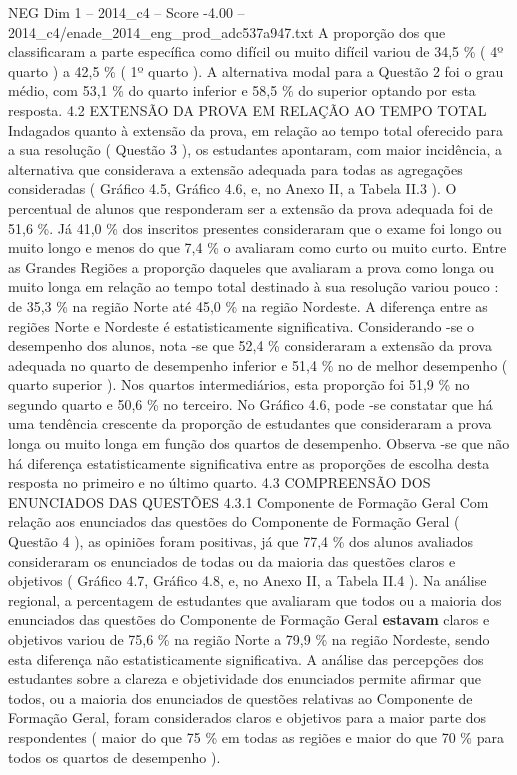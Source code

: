 \begin{textsample}{NEG Dim 1 – 2014\_c4 – Score -4.00 – 2014\_c4/enade\_2014\_eng\_prod\_adc537a947.txt}
A proporção dos que classificaram a parte específica como difícil ou muito difícil variou de 34,5 \% ( 4º quarto ) a 42,5 \% ( 1º quarto ).
A alternativa modal para a Questão 2 foi o grau médio, com 53,1 \% do quarto inferior e 58,5 \% do superior optando por esta resposta. 4.2 EXTENSÃO DA PROVA EM RELAÇÃO AO TEMPO TOTAL Indagados quanto à extensão da prova, em relação ao tempo total oferecido para a sua resolução ( Questão 3 ), os estudantes apontaram, com maior incidência, a alternativa que considerava a extensão adequada para todas as agregações consideradas ( Gráfico 4.5, Gráfico 4.6, e, no Anexo II, a Tabela II.3 ).
O percentual de alunos que responderam ser a extensão da prova adequada foi de 51,6 \%.
Já 41,0 \% dos inscritos presentes consideraram que o exame foi longo ou muito longo e menos do que 7,4 \% o avaliaram como curto ou muito curto.
Entre as Grandes Regiões a proporção daqueles que avaliaram a prova como longa ou muito longa em relação ao tempo total destinado à sua resolução variou pouco : de 35,3 \% na região Norte até 45,0 \% na região Nordeste.
A diferença entre as regiões Norte e Nordeste é estatisticamente significativa.
Considerando -se o desempenho dos alunos, nota -se que 52,4 \% consideraram a extensão da prova adequada no quarto de desempenho inferior e 51,4 \% no de melhor desempenho ( quarto superior ).
Nos quartos intermediários, esta proporção foi 51,9 \% no segundo quarto e 50,6 \% no terceiro.
No Gráfico 4.6, pode -se constatar que há uma tendência crescente da proporção de estudantes que consideraram a prova longa ou muito longa em função dos quartos de desempenho.
Observa -se que não há diferença estatisticamente significativa entre as proporções de escolha desta resposta no primeiro e no último quarto. 4.3 COMPREENSÃO DOS ENUNCIADOS DAS QUESTÕES 4.3.1 Componente de Formação Geral Com relação aos enunciados das questões do Componente de Formação Geral ( Questão 4 ), as opiniões foram positivas, já que 77,4 \% dos alunos avaliados consideraram os enunciados de todas ou da maioria das questões claros e objetivos ( Gráfico 4.7, Gráfico 4.8, e, no Anexo II, a Tabela II.4 ).
Na análise regional, a percentagem de estudantes que avaliaram que todos ou a maioria dos enunciados das questões do Componente de Formação Geral \textbf{estavam} claros e objetivos variou de 75,6 \% na região Norte a 79,9 \% na região Nordeste, sendo esta diferença não estatisticamente significativa.
A análise das percepções dos estudantes sobre a clareza e objetividade dos enunciados permite afirmar que todos, ou a maioria dos enunciados de questões relativas ao Componente de Formação Geral, foram considerados claros e objetivos para a maior parte dos respondentes ( maior do que 75 \% em todas as regiões e maior do que 70 \% para todos os quartos de desempenho ).

\end{textsample}
